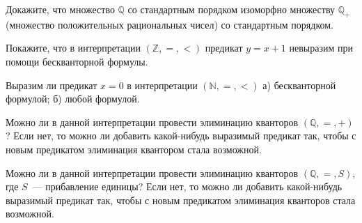
\begin{task}
    Докажите, что множество $\mathbb{Q}$ со стандартным порядком изоморфно множеству $\mathbb{Q}_{+}$ (множество положительных
    рациональных чисел) со стандартным порядком.
\end{task}

\begin{task}
    Покажите, что в интерпретации $(\mathbb{Z}, =, <)$ предикат $y = x + 1$ невыразим при помощи бескванторной формулы.
\end{task}

\begin{task}
    Выразим ли предикат $x = 0$ в интерпретации $(\mathbb{N}, =, <)$ а) бескванторной формулой; б) любой формулой.
\end{task}

\begin{task}
    Можно ли в данной интерпретации провести элиминацию кванторов $(\mathbb{Q}, =, +)$? Если нет, то можно ли добавить какой-нибудь
    выразимый предикат так, чтобы с новым предикатом элиминация квантором стала возможной.
\end{task}

\begin{task}
    Можно ли в данной интерпретации провести элиминацию кванторов $(\mathbb{Q}, =, S)$, где $S$~--- прибавление единицы? Если нет,
    то можно ли добавить какой-нибудь выразимый предикат так, чтобы с новым предикатом элиминация кванторов стала возможной.
\end{task}
